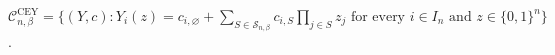 \(\mathcal C^{\mathrm{CEY}}_{n,\beta}=\{(Y,c):Y_i(z)=c_{i,\varnothing}+\sum_{S\in\mathcal S_{n,\beta}}c_{i,S}\prod_{j\in S}z_j\text{ for every }i\in I_n\text{ and }z\in\{0,1\}^n\}\).
